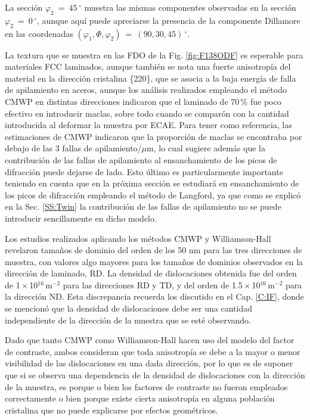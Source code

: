La sección $\varphi_2 \ = \ 45$\,$^{\circ}$ muestra las mismas componentes observadas en la sección $\varphi_2 \ = \ 0$\,$^{\circ}$, aunque aquí puede apreciarse la presencia de la componente Dillamore en las coordenadas $(\varphi_1, \Phi, \varphi_2) \ = \ (90, 30, 45)$\,$^{\circ}$.

La textura que se muestra en las FDO de la Fig. \ref{fig:F138ODF} es esperable para materiales FCC laminados, aunque también se nota una fuerte anisotropía del material en la dirección cristalina \{220\}, que se asocia a la baja energía de falla de apilamiento en aceros\cite{Sathiaraj2015,Saleh2012}, aunque los análisis realizados empleando el método CMWP en distintas direcciones indicaron que el laminado de 70\,\% fue poco efectivo en introducir maclas, sobre todo cuando se comparón con la cantidad introducida al deformar la muestra por ECAE.
Para tener como referencia, las estimaciones de CMWP indicaron que la proporción de maclas se encontraba por debajo de las 3 fallas de apilamiento/$\mu$m, lo cual sugiere además que la contribución de las fallas de apilamiento al ensanchamiento de los picos de difracción puede dejarse de lado.
Esto último es particularmente importante teniendo en cuenta que en la próxima sección se estudiará en ensanchamiento de los picos de difracción empleando el método de Langford, ya que como se explicó en la Sec. \ref{SS:Twin} la contribución de las fallas de apilamiento no se puede introducir sencillamente en dicho modelo.

Los estudios realizados aplicando los métodos CMWP y Williamson-Hall revelaron tamaños de dominio del orden de los 50 nm para las tres direcciones de muestra, con valores algo mayores para los tamaños de dominios observados en la dirección de laminado, RD.
La densidad de dislocaciones obtenida fue del orden de 1\,$\times$\,10$^{16}$\,m$^{-2}$ para las direcciones RD y TD, y del orden de 1.5\,$\times$\,10$^{16}$\,m$^{-2}$ para la dirección ND.
Esta discrepancia recuerda los discutido en el Cap. \ref{C:IF}, donde se mencionó que la densidad de dislocaciones debe ser una cantidad independiente de la dirección de la muestra que se esté observando.

Dado que tanto CMWP como Williamson-Hall hacen uso del modelo del factor de contraste, ambos consideran que toda anisotropía se debe a la mayor o menor visibilidad de las dislocaciones en una dada dirección, por lo que es de suponer que si se observa una dependencia de la densidad de dislocaciones con la dirección de la muestra, es porque o bien los factores de contraste no fueron empleados correctamente o bien porque existe cierta anisotropía en alguna población cristalina que no puede explicarse por efectos geométricos.

